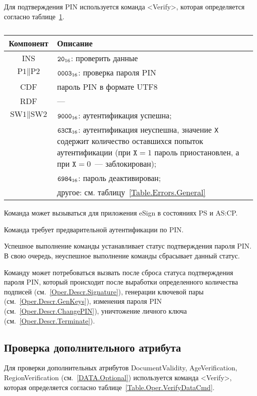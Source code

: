 Для подтверждения PIN используется команда
<Verify>, которая определяется согласно 
таблице~\ref{Table.Oper.VerifyPINCmd}.

\begin{table}[hbt]
\caption{}\label{Table.Oper.VerifyPINCmd}
\begin{tabular}{|c|p{14cm}|}
\hline
Компонент & Описание \\
\hline
\hline
INS & $\texttt{20}_{16}$: проверить данные\\
\hline
$\text{P1} \parallel \text{P2}$ & $\texttt{0003}_{16}$: 
проверка пароля PIN\\
\hline
CDF & пароль PIN в формате UTF8 \\
\hline 
RDF &  --- \\
\hline
$\text{SW1} \parallel \text{SW2}$ & $\texttt{9000}_{16}$: аутентификация успешна;\\
 & $\texttt{63CX}_{16}$: аутентификация неуспешна, значение \texttt{X} содержит количество 
оставшихся попыток аутентификации (при $\texttt{X} = 1$ пароль 
приостановлен, а при $\texttt{X} = 0$~--- заблокирован);\\
& $\texttt{6984}_{16}$: пароль деактивирован; \\
 & другое: см. таблицу~\ref{Table.Errors.General} \\
\hline
\end{tabular}
\end{table}

Команда может вызываться для приложения eSign
в состояниях PS и AS:CP.

Команда требует предварительной аутентификации по PIN.

Успешное выполнение команды устанавливает 
статус подтверждения пароля PIN.
В свою очередь, неуспешное выполнение команды 
сбрасывает данный статус.

Команду может потребоваться вызвать после сброса статуса
подтверждения пароля PIN, который происходит 
после выработки определенного количества подписей (см.~\ref{Oper.Descr.Signature}),
генерации ключевой пары (см.~\ref{Oper.Descr.GenKeys}),
изменения пароля PIN (см.~\ref{Oper.Descr.ChangePIN}),
уничтожение личного ключа (см.~\ref{Oper.Descr.Terminate}).

\subsection{Проверка дополнительного атрибута}
\label{Oper.Descr.VerifyData}

Для проверки дополнительных атрибутов 
DocumentValidity, AgeVerification, RegionVerification (см.~\ref{DATA.Optional}) 
используется команда  <Verify>, которая определяется согласно 
таблице~\ref{Table.Oper.VerifyDataCmd}.

